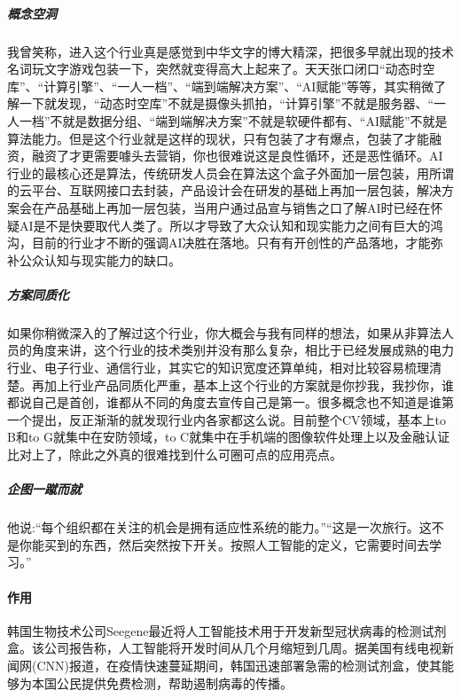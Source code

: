 \documentclass[letterpaper,11pt,english]{sphinxmanual}
\begin{document}
\subparagraph{概念空洞}
\label{\detokenize{chapter_introduction/AI:id19}}
我曾笑称，进入这个行业真是感觉到中华文字的博大精深，把很多早就出现的技术名词玩文字游戏包装一下，突然就变得高大上起来了。天天张口闭口“动态时空库”、“计算引擎”、“一人一档”、“端到端解决方案”、“AI赋能”等等，其实稍微了解一下就发现，“动态时空库”不就是摄像头抓拍，“计算引擎”不就是服务器、“一人一档”不就是数据分组、“端到端解决方案”不就是软硬件都有、“AI赋能”不就是算法能力。但是这个行业就是这样的现状，只有包装了才有爆点，包装了才能融资，融资了才更需要噱头去营销，你也很难说这是良性循环，还是恶性循环。AI行业的最核心还是算法，传统研发人员会在算法这个盒子外面加一层包装，用所谓的云平台、互联网接口去封装，产品设计会在研发的基础上再加一层包装，解决方案会在产品基础上再加一层包装，当用户通过品宣与销售之口了解AI时已经在怀疑AI是不是快要取代人类了。所以才导致了大众认知和现实能力之间有巨大的鸿沟，目前的行业才不断的强调AI决胜在落地。只有有开创性的产品落地，才能弥补公众认知与现实能力的缺口。


\subparagraph{方案同质化}
\label{\detokenize{chapter_introduction/AI:id20}}
如果你稍微深入的了解过这个行业，你大概会与我有同样的想法，如果从非算法人员的角度来讲，这个行业的技术类别并没有那么复杂，相比于已经发展成熟的电力行业、电子行业、通信行业，其实它的知识宽度还算单纯，相对比较容易梳理清楚。再加上行业产品同质化严重，基本上这个行业的方案就是你抄我，我抄你，谁都说自己是首创，谁都从不同的角度去宣传自己是第一。很多概念也不知道是谁第一个提出，反正渐渐的就发现行业内各家都这么说。目前整个CV领域，基本上to
B和to G就集中在安防领域，to
C就集中在手机端的图像软件处理上以及金融认证比对上了，除此之外真的很难找到什么可圈可点的应用亮点。


\subparagraph{企图一蹴而就}
\label{\detokenize{chapter_introduction/AI:id21}}
他说:“每个组织都在关注的机会是拥有适应性系统的能力。”“这是一次旅行。这不是你能买到的东西，然后突然按下开关。按照人工智能的定义，它需要时间去学习。”


\paragraph{作用}
\label{\detokenize{chapter_introduction/AI:id22}}
韩国生物技术公司Seegene最近将人工智能技术用于开发新型冠状病毒的检测试剂盒。该公司报告称，人工智能将开发时间从几个月缩短到几周。据美国有线电视新闻网(CNN)报道，在疫情快速蔓延期间，韩国迅速部署急需的检测试剂盒，使其能够为本国公民提供免费检测，帮助遏制病毒的传播。%
\begin{footnote}[190]\sphinxAtStartFootnote
{}
%
\end{footnote}
\end{document}
